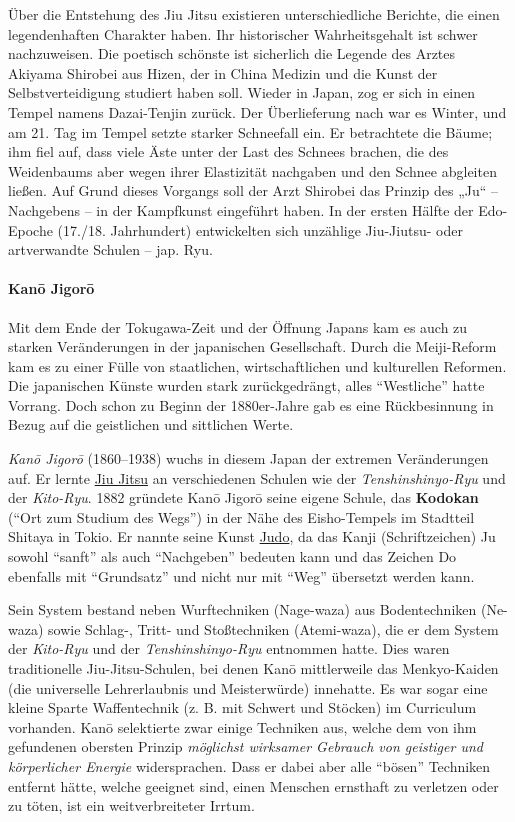 \documentclass[justified, a4paper, notitlepage, captions=tableheading, nobib]{tufte-handout}
\begin{document}
Über die Entstehung des \label{orgd95ae56}Jiu Jitsu existieren unterschiedliche Berichte, die einen legendenhaften Charakter haben. Ihr historischer Wahrheitsgehalt ist schwer nachzuweisen. Die poetisch schönste ist sicherlich die Legende des Arztes Akiyama Shirobei aus Hizen, der in China Medizin und die Kunst der Selbstverteidigung studiert haben soll. Wieder in Japan, zog er sich in einen Tempel namens Dazai-Tenjin zurück. Der Überlieferung nach war es Winter, und am 21. Tag im Tempel setzte starker Schneefall ein. Er betrachtete die Bäume; ihm fiel auf, dass viele Äste unter der Last des Schnees brachen, die des Weidenbaums aber wegen ihrer Elastizität nachgaben und den Schnee abgleiten ließen. Auf Grund dieses Vorgangs soll der Arzt Shirobei das Prinzip des „Ju“ – Nachgebens – in der Kampfkunst eingeführt haben. In der ersten Hälfte der Edo-Epoche (17./18. Jahrhundert) entwickelten sich unzählige Jiu-Jiutsu- oder artverwandte Schulen – jap. Ryu.

\paragraph{Kanō Jigorō}
\label{sec:org7dcaf17}
Mit dem Ende der Tokugawa-Zeit und der Öffnung Japans kam es auch zu starken Veränderungen in der japanischen Gesellschaft. Durch die Meiji-Reform kam es zu einer Fülle von staatlichen, wirtschaftlichen und kulturellen Reformen. Die japanischen Künste wurden stark zurückgedrängt, alles "`Westliche"' hatte Vorrang. Doch schon zu Beginn der 1880er-Jahre gab es eine Rückbesinnung in Bezug auf die geistlichen und sittlichen Werte.

\emph{Kanō Jigorō} (1860–1938) wuchs in diesem Japan der extremen Veränderungen auf. Er lernte \hyperref[orgd95ae56]{Jiu Jitsu} an verschiedenen Schulen wie der \emph{Tenshinshinyo-Ryu} und der \emph{Kito-Ryu}. 1882 gründete Kanō Jigorō seine eigene Schule, das \textbf{Kodokan} ("`Ort zum Studium des Wegs"') in der Nähe des Eisho-Tempels im Stadtteil Shitaya in Tokio. Er nannte seine Kunst \hyperref[org39a3ee2]{Judo}, da das Kanji (Schriftzeichen) Ju sowohl "`sanft"' als auch "`Nachgeben"' bedeuten kann und das Zeichen Do ebenfalls mit "`Grundsatz"' und nicht nur mit "`Weg"' übersetzt werden kann.

Sein System bestand neben Wurftechniken (Nage-waza) aus Bodentechniken (Ne-waza) sowie Schlag-, Tritt- und Stoßtechniken (Atemi-waza), die er dem System der \emph{Kito-Ryu} und der \emph{Tenshinshinyo-Ryu} entnommen hatte. Dies waren traditionelle Jiu-Jitsu-Schulen, bei denen Kanō mittlerweile das Menkyo-Kaiden (die universelle Lehrerlaubnis und Meisterwürde) innehatte. Es war sogar eine kleine Sparte Waffentechnik (z. B. mit Schwert und Stöcken) im Curriculum vorhanden. Kanō selektierte zwar einige Techniken aus, welche dem von ihm gefundenen obersten Prinzip \emph{möglichst wirksamer Gebrauch von geistiger und körperlicher Energie} widersprachen. Dass er dabei aber alle "`bösen"' Techniken entfernt hätte, welche geeignet sind, einen Menschen ernsthaft zu verletzen oder zu töten, ist ein weitverbreiteter Irrtum.
\end{document}
